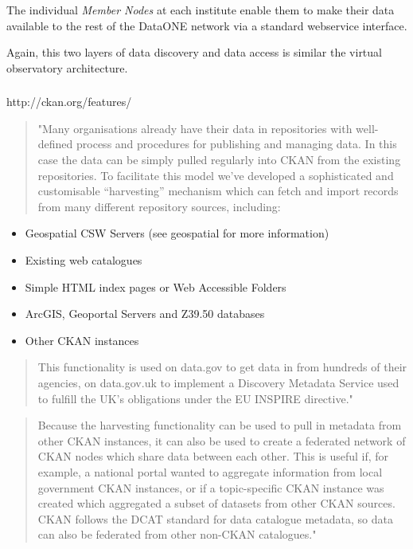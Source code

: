 \documentclass{article}
\begin{document}
The individual \textit{Member Nodes}
at each institute enable them to make their data available
to the rest of the DataONE network
via a standard webservice interface.

Again, this two layers of data discovery and data access
is similar the virtual observatory architecture.


\subsubsection{}

http://ckan.org/features/
\begin{quote}
"Many organisations already have their data in repositories with well-defined process and procedures
for publishing and managing data. In this case the data can be simply pulled regularly into CKAN
from the existing repositories. To facilitate this model we’ve developed a sophisticated and
customisable “harvesting” mechanism which can fetch and import records from many different
repository sources, including:
\end{quote}
\begin{itemize}
\item Geospatial CSW Servers (see geospatial for more information)
\item Existing web catalogues
\item Simple HTML index pages or Web Accessible Folders
\item ArcGIS, Geoportal Servers and Z39.50 databases
\item Other CKAN instances
\end{itemize}
\begin{quote}
This functionality is used on data.gov to get data in from hundreds of their agencies,
on data.gov.uk to implement a Discovery Metadata Service used to fulfill the UK’s
obligations under the EU INSPIRE directive."
\end{quote}

\begin{quote}
Because the harvesting functionality can be used to pull in metadata from other CKAN instances,
it can also be used to create a federated network of CKAN nodes which share data between each other.
This is useful if, for example, a national portal wanted to aggregate information from local
government CKAN instances, or if a topic-specific CKAN instance was created which aggregated
a subset of datasets from other CKAN sources. CKAN follows the DCAT standard for data catalogue
metadata, so data can also be federated from other non-CKAN catalogues." 
\end{quote}
\end{document}
